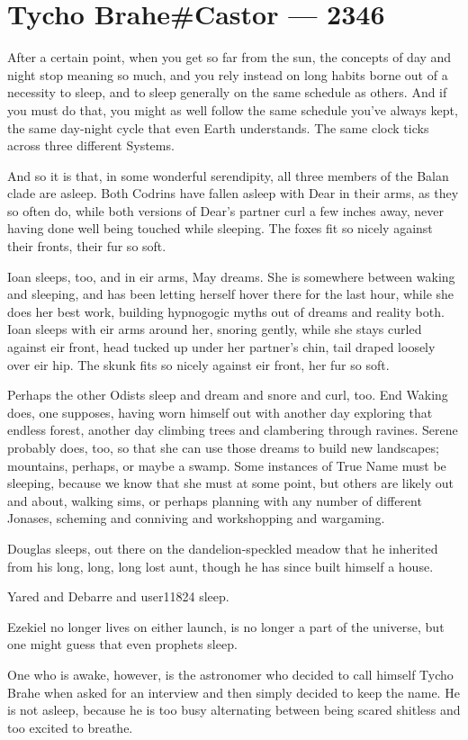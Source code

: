 \hypertarget{tycho-brahecastor-2346}{%
\chapter{Tycho Brahe\#Castor — 2346}\label{tycho-brahecastor-2346}}

After a certain point, when you get so far from the sun, the concepts of day and night stop meaning so much, and you rely instead on long habits borne out of a necessity to sleep, and to sleep generally on the same schedule as others. And if you must do that, you might as well follow the same schedule you've always kept, the same day-night cycle that even Earth understands. The same clock ticks across three different Systems.

And so it is that, in some wonderful serendipity, all three members of the Balan clade are asleep. Both Codrins have fallen asleep with Dear in their arms, as they so often do, while both versions of Dear's partner curl a few inches away, never having done well being touched while sleeping. The foxes fit so nicely against their fronts, their fur so soft.

Ioan sleeps, too, and in eir arms, May dreams. She is somewhere between waking and sleeping, and has been letting herself hover there for the last hour, while she does her best work, building hypnogogic myths out of dreams and reality both. Ioan sleeps with eir arms around her, snoring gently, while she stays curled against eir front, head tucked up under her partner's chin, tail draped loosely over eir hip. The skunk fits so nicely against eir front, her fur so soft.

Perhaps the other Odists sleep and dream and snore and curl, too. End Waking does, one supposes, having worn himself out with another day exploring that endless forest, another day climbing trees and clambering through ravines. Serene probably does, too, so that she can use those dreams to build new landscapes; mountains, perhaps, or maybe a swamp. Some instances of True Name must be sleeping, because we know that she must at some point, but others are likely out and about, walking sims, or perhaps planning with any number of different Jonases, scheming and conniving and workshopping and wargaming.

Douglas sleeps, out there on the dandelion-speckled meadow that he inherited from his long, long, long lost aunt, though he has since built himself a house.

Yared and Debarre and user11824 sleep.

Ezekiel no longer lives on either launch, is no longer a part of the universe, but one might guess that even prophets sleep.

One who is awake, however, is the astronomer who decided to call himself Tycho Brahe when asked for an interview and then simply decided to keep the name. He is not asleep, because he is too busy alternating between being scared shitless and too excited to breathe.
